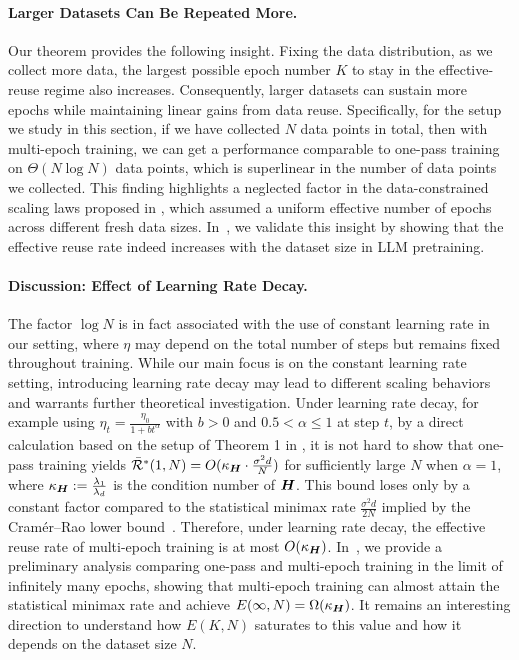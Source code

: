 \paragraph{Larger Datasets Can Be Repeated More.} 
Our theorem provides the following insight.
Fixing the data distribution, as we collect more data, the largest possible epoch number $K$ to stay in the effective-reuse regime also increases.
Consequently, larger datasets can sustain more epochs while maintaining linear gains from data reuse.
Specifically, for the setup we study in this section, if we have collected $N$ data points in total, then with multi-epoch training, we can get a performance comparable to one-pass training on $\Theta(N \log N)$ data points, which is superlinear in the number of data points we collected.
This finding highlights a neglected factor in the data-constrained scaling laws proposed in \citet{muennighoff2023scaling}, which assumed a uniform effective number of epochs across different fresh data sizes.
In~, we validate this insight by showing that the effective reuse rate indeed increases with the dataset size in LLM pretraining.

\paragraph{Discussion: Effect of Learning Rate Decay.} The factor $\log N$ is in fact associated with the use of constant learning rate in our setting, where $\eta$ may depend on the total number of steps but remains fixed throughout training.
While our main focus is on the constant learning rate setting, introducing learning rate decay may lead to different scaling behaviors and warrants further theoretical investigation.
Under learning rate decay, for example using $\eta_t = \frac{\eta_0}{1 + b t^\alpha}$ with $b > 0$ and $0.5 < \alpha \le 1$ at step $t$, by a direct calculation based on the setup of Theorem 1 in \citet{ge2019step}, it is not hard to show that one-pass training yields $\Bar{\mathcal{R}}^*(1,N) = O(\kappa_{{\bm{H}}} \cdot \frac{\sigma^2 d}{N})$ for sufficiently large $N$ when $\alpha=1$, where $\kappa_{{\bm{H}}} := \frac{\lambda_1}{\lambda_d}$ is the condition number of ${\bm{H}}$. 
This bound loses only by a constant factor compared to the statistical minimax rate $\frac{\sigma^2 d}{2N}$ implied by the Cramér--Rao lower bound~\citep{jain2017markov}.
Therefore, under learning rate decay, the effective reuse rate of multi-epoch training is at most $O(\kappa_{{\bm{H}}})$.
In~, we provide a preliminary analysis comparing one-pass and multi-epoch training in the limit of infinitely many epochs, showing that multi-epoch training can almost attain the statistical minimax rate and achieve $E(\infty, N) = \Omega(\kappa_{{\bm{H}}})$.
It remains an interesting direction to understand how $E(K, N)$ saturates to this value and how it depends on the dataset size $N$.

